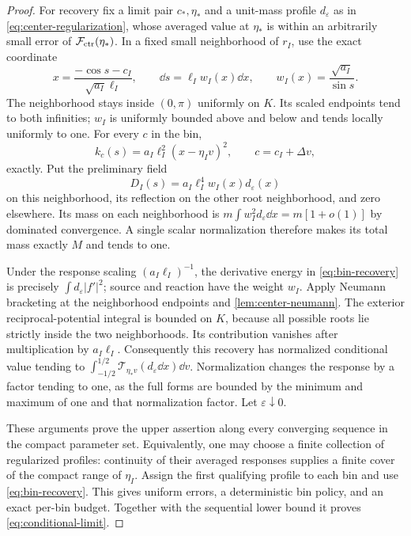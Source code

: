 \begin{proof}
For recovery fix a limit pair $c_*,\eta_*$ and a unit-mass
profile $d_\varepsilon$ as in \eqref{eq:center-regularization},
whose averaged value at $\eta_*$ is within an arbitrarily small
error of $\mathcal F_{\rm ctr}(\eta_*)$. In a fixed small
neighborhood of $r_I$, use the exact coordinate
\begin{equation}\label{eq:regular-exact-coordinate}
 x=\frac{-\cos s-c_I}{\sqrt{a_I}\ell_I},\qquad
 \dd s=\ell_Iw_I(x)\dd x,\qquad
 w_I(x)=\frac{\sqrt{a_I}}{\sin s}.
\end{equation}
The neighborhood stays inside $(0,\pi)$ uniformly on $K$.
Its scaled endpoints tend to both infinities; $w_I$ is uniformly
bounded above and below and tends locally uniformly to one.
For every $c$ in the bin,
\[
 k_c(s)=a_I\ell_I^2(x-\eta_Iv)^2,
                         \qquad c=c_I+\Delta v,
\]
exactly. Put the preliminary field
\begin{equation}\label{eq:bin-recovery}
        D_I(s)=a_I\ell_I^4w_I(x)d_\varepsilon(x)
\end{equation}
on this neighborhood, its reflection on the other root
neighborhood, and zero elsewhere. Its mass on each neighborhood
is $m\int w_I^2d_\varepsilon\dd x=m[1+o(1)]$ by dominated
convergence. A single scalar normalization therefore makes its
total mass exactly $M$ and tends to one.

Under the response scaling $(a_I\ell_I)^{-1}$, the derivative
energy in \eqref{eq:bin-recovery} is precisely
$\int d_\varepsilon|f'|^2$; source and reaction have the weight
$w_I$. Apply Neumann bracketing at the neighborhood endpoints
and \cref{lem:center-neumann}. The exterior reciprocal-potential
integral is bounded on $K$, because all possible roots lie
strictly inside the two neighborhoods. Its contribution vanishes
after multiplication by $a_I\ell_I$. Consequently this recovery
has normalized conditional value tending to
$\int_{-1/2}^{1/2}\mathscr T_{\eta_*v}(d_\varepsilon\dd x)\dd v$.
Normalization changes the response by a factor tending to one,
as the full forms are bounded by the minimum and maximum of one
and that normalization factor. Let $\varepsilon\downarrow0$.

These arguments prove the upper assertion along every converging
sequence in the compact parameter set. Equivalently, one may
choose a finite collection of regularized profiles: continuity
of their averaged responses supplies a finite cover of the
compact range of $\eta_I$. Assign the first qualifying profile
to each bin and use \eqref{eq:bin-recovery}. This gives uniform
errors, a deterministic bin policy, and an exact per-bin budget.
Together with the sequential lower bound it proves
\eqref{eq:conditional-limit}.
\end{proof}


